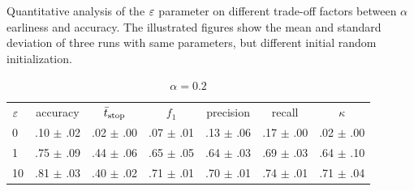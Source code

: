 \documentclass[%
  aspectratio=169,
  9pt,
  USenglish,
  titlegraphic, %
  progressbar,
]{beamer}
\begin{document}
\begin{frame}
	
	
	\begin{table}
		\caption{Quantitative analysis of the $\varepsilon$ parameter on different trade-off factors between $\alpha$ earliness and accuracy. The illustrated figures show the mean and standard deviation of three runs with same parameters, but different initial random initialization.}
		\label{tab:epsilon:quantitative}
		\setlength{\belowcaptionskip}{0pt}
		
		\begin{subtable}{.5\textwidth}
			\scriptsize
			\hspace{-1em}\begin{tabular}{lcccccc}
				\toprule
				\textbf{$\varepsilon$} & accuracy & $\bar{t}_\text{stop}$  & $f_1$ & precision & recall & $\kappa$ \\
				\cmidrule(lr){0-0}\cmidrule(lr){1-1}\cmidrule(lr){2-2}\cmidrule(lr){3-3}\cmidrule(lr){4-4}\cmidrule(lr){5-5}\cmidrule(lr){6-6}\cmidrule(lr){7-7}
				0 & .10 $\pm$ .02 & .02 $\pm$ .00 & .07 $\pm$ .01 & .13 $\pm$ .06 & .17 $\pm$ .00 & .02 $\pm$ .00 \\
				1 & .75 $\pm$ .09 & .44 $\pm$ .06 & .65 $\pm$ .05 & .64 $\pm$ .03 & .69 $\pm$ .03 & .64 $\pm$ .10 \\
				10 & .81 $\pm$ .03 & .40 $\pm$ .02 & .71 $\pm$ .01 & .70 $\pm$ .01 & .74 $\pm$ .01 & .71 $\pm$ .04 \\
				\bottomrule
			\end{tabular}
			\caption{\emph{$\alpha=0.2$}}
			\label{tab:epsilon:a02}
		\end{subtable}

\end{table}
\end{frame}
\end{document}
